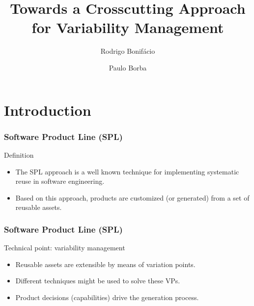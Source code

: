 \documentclass[13pt]{beamer}
\title{Towards a Crosscutting Approach for Variability Management}
\author{Rodrigo Bonif\'{a}cio \and Paulo Borba}
\institute
{
	Informatics Center \\ Federal University of Pernambuco \\ Brazil
}
\begin{document}
\begin{frame}
\titlepage
\end{frame}

\section{Introduction}

\begin{frame}
\frametitle{Software Product Line (SPL)}

\begin{block}{Definition}
\begin{itemize}
  \item The SPL approach is a well known technique for implementing systematic
  reuse in software engineering.
  \item Based on this approach, products are customized (or generated) from a
  set of reusable assets.
\end{itemize}
\end{block}
\end{frame}

\begin{frame}
\frametitle{Software Product Line (SPL)}

\begin{block}{Technical point: variability management}
\begin{itemize}
  \item Reusable assets are extensible by means of variation points.
  \item Different techniques might be used to solve these VPs.
  \item Product decisions (capabilities) drive the generation process.
\end{itemize}
\end{block}


\end{frame}
\end{document}
